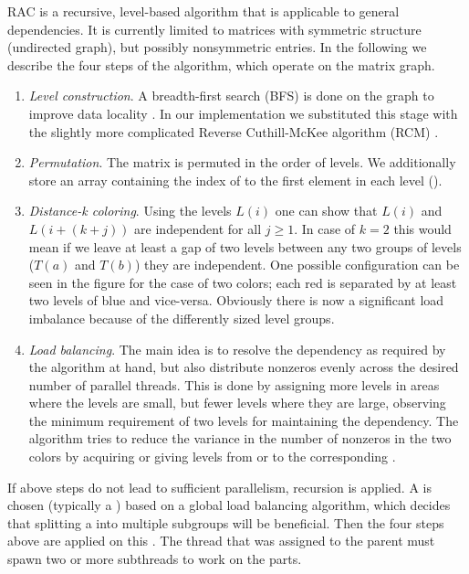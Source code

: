 RAC is a recursive, level-based algorithm that is applicable to
general \DK dependencies. It is currently limited to matrices
with symmetric structure (undirected graph), but possibly nonsymmetric
entries. In the following we describe the four steps of the
algorithm, which operate on the matrix graph.
\begin{enumerate}
\item \emph{Level construction}.  A breadth-first search (BFS)
  \cite{BFS} is done on the graph to improve data locality
  \cite{RCM_Sparse_computation}. In our implementation we substituted
  this stage with the slightly more complicated Reverse Cuthill-McKee
  algorithm (RCM) \cite{RCM}.
		
\item \emph{Permutation}. The matrix is permuted in the order of
  levels.  We additionally store an array containing the index
  of to the first element in each level (\levelPtr).
		
\item \emph{Distance-k coloring}. Using the levels $L(i)$ one can
  show that $L(i)$ and $L(i+(k+j))$ are \DK independent
  for all $j\geq1$. In case of $k=2$ this would mean if we
  leave at least a gap of two levels between any two groups of levels
  ($T(a)$ and $T(b)$) they are \DTWO independent.
  One possible
  configuration can be seen in the figure for the case of two colors;
  each red \levelGroup is separated by at least two
  levels of blue and vice-versa. Obviously there is now
  a significant load imbalance because of the differently sized
  level groups.
  		
\item \emph{Load balancing}. The main idea is to resolve the \DK
  dependency as required by the algorithm at hand, but also distribute
  nonzeros evenly across the desired number of parallel threads.  This
  is done by assigning more levels in areas where the levels are
  small, but fewer levels where they are large, observing the minimum
  requirement of two levels for maintaining the \DTWO dependency.
  The algorithm tries to reduce the variance in the number of nonzeros
  in the two colors by acquiring or giving levels from or to the
  corresponding \levelGroup.
\end{enumerate}
If above steps do not lead to sufficient parallelism, recursion is
applied. A \subgraph is chosen  (typically a \levelGroup) based
on a global load balancing algorithm, which decides that splitting
a \levelGroup into multiple subgroups will be beneficial. Then
the four steps above are applied on this \subgraph. The thread
that was assigned to the parent \subgraph must spawn two or more
subthreads to work on the parts. 

